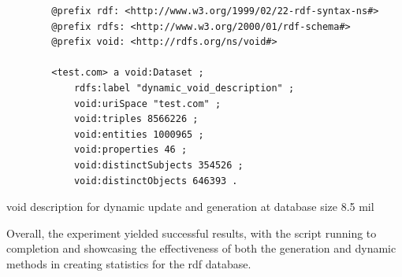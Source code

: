 \begin{listing}[htb!]
    \begin{verbatim}
        @prefix rdf: <http://www.w3.org/1999/02/22-rdf-syntax-ns#>
        @prefix rdfs: <http://www.w3.org/2000/01/rdf-schema#>
        @prefix void: <http://rdfs.org/ns/void#>
        
        <test.com> a void:Dataset ;
            rdfs:label "dynamic_void_description" ;
            void:uriSpace "test.com" ;
            void:triples 8566226 ;
            void:entities 1000965 ;
            void:properties 46 ;
            void:distinctSubjects 354526 ;
            void:distinctObjects 646393 .
    \end{verbatim}
    \caption{\gls{void} description for dynamic update and generation at database size 8.5 mil}
    \label{fig:VOID-description-result}
\end{listing}
Overall, the experiment yielded successful results, with the script running to completion and showcasing the effectiveness of both the generation and dynamic methods in creating statistics for the  \gls{rdf} database.















